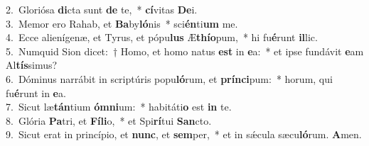 {2.~}Gloriósa \textbf{di}cta sunt \textbf{de} te,~* \textbf{cí}vitas \textbf{De}i.\\
{3.~}Memor ero Rahab, et \textbf{Ba}by\textbf{ló}nis~* sci\textbf{én}ti\textbf{um} me.\\
{4.~}Ecce alienígenæ, et Tyrus, et pópu\textbf{lus} Æ\textbf{thí}\textbf{o}pum,~* hi fu\textbf{é}runt \textbf{il}lic.\\
{5.~}Numquid Sion dicet:~† Homo, et homo natus \textbf{est} in \textbf{e}a:~* et ipse fundávit \textbf{e}am Al\textbf{tís}simus?\\
{6.~}Dóminus narrábit in scriptúris popu\textbf{ló}rum, et \textbf{prín}\textbf{ci}pum:~* horum, qui fu\textbf{é}runt in \textbf{e}a.\\
{7.~}Sicut læ\textbf{tán}tium \textbf{óm}\textbf{ni}um:~* habitáti\textbf{o} est \textbf{in} te.\\
{8.~}Glória \textbf{Pa}tri, et \textbf{Fí}\textbf{li}o,~* et Spi\textbf{rí}tui \textbf{San}cto.\\
{9.~}Sicut erat in princípio, et \textbf{nunc}, et \textbf{sem}per,~* et in sǽcula sæcu\textbf{ló}rum. \textbf{A}men.\\
